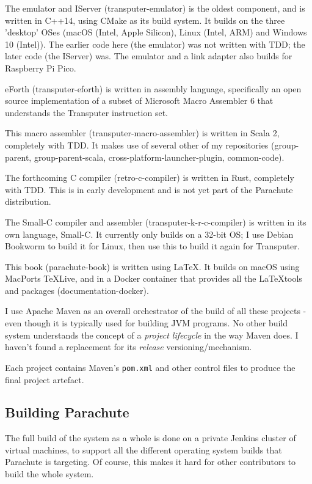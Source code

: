 \documentclass[a4paper]{tufte-book}
\begin{document}
The emulator and IServer (transputer-emulator) is the oldest component, and is written in C++14, using CMake as its build system. It builds on the three 'desktop' OSes (macOS (Intel, Apple Silicon), Linux (Intel, ARM) and Windows 10 (Intel)). The earlier code here (the emulator) was not written with TDD; the later code (the IServer) was. The emulator and a link adapter also builds for Raspberry Pi Pico.

eForth (transputer-eforth) is written in assembly language, specifically an open source implementation of a subset of Microsoft Macro Assembler 6 that understands the Transputer instruction set.

This macro assembler (transputer-macro-assembler) is written in Scala 2, completely with TDD. It makes use of several other of my repositories (group-parent, group-parent-scala, cross-platform-launcher-plugin, common-code).

The forthcoming C compiler (retro-c-compiler) is written in Rust, completely with TDD. This is in early development and is not yet part of the Parachute distribution.

The Small-C compiler and assembler (transputer-k-r-c-compiler) is written in its own language, Small-C. It currently only builds on a 32-bit OS; I use Debian Bookworm to build it for Linux, then use this to build it again for Transputer.

This book (parachute-book) is written using \LaTeX. It builds on macOS using MacPorts TeXLive, and in a Docker container that provides all the \LaTeX \space tools and packages (documentation-docker).

\vspace{5mm}

I use Apache Maven as an overall orchestrator of the build of all these projects - even though it is typically used for building JVM programs. No other build system understands the concept of a \textit{project lifecycle} in the way Maven does. I haven't found a replacement for its \textit{release} versioning/mechanism. 

Each project contains Maven's \texttt{pom.xml} and other control files to produce the final project artefact.

\subsection{Building Parachute}
The full build of the system as a whole is done on a private Jenkins cluster of virtual machines, to support all the different operating system builds that Parachute is targeting. Of course, this makes it hard for other contributors to build the whole system.
\end{document}
